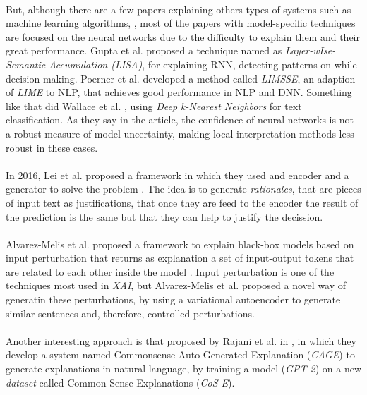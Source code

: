 \paragraph{}
But, although there are a few papers explaining others types of systems such as machine learning algorithms, \cite{Pappas2014}, most of the papers with model-specific techniques are focused on the neural networks due to the difficulty to explain them and their great performance. Gupta et al. proposed a technique named as \emph{Layer-wIse-Semantic-Accumulation (LISA)}, \cite{Gupta2018} for explaining RNN, detecting patterns on while decision making. Poerner et al. developed a method called \emph{LIMSSE}, an adaption of \emph{LIME} to NLP, that achieves good performance in NLP and DNN. Something like that did Wallace et al. \cite{Wallace2018}, using \emph{Deep k-Nearest Neighbors}\cite{Papernot2018} for text classification. As they say in the article, the confidence of neural networks is not a robust measure of model uncertainty, making local interpretation methods less robust in these cases.
\paragraph{}
In 2016, Lei et al. proposed a framework in which they used and encoder and a generator to solve the problem \cite{Lei2016}. The idea is to generate \emph{rationales}, that are pieces of input text as justifications, that once they are feed to the encoder the result of the prediction is the same but that they can help to justify the decission. 
\paragraph{}
Alvarez-Melis et al. proposed a framework to explain black-box models based on input perturbation that returns as explanation a set of input-output tokens that are related to each other inside the model \cite{Alvarez2017}. Input perturbation is one of the techniques most used in \emph{XAI}, but Alvarez-Melis et al. proposed a novel way of generatin these perturbations, by using a variational autoencoder to generate similar sentences and, therefore, controlled perturbations. 
\paragraph{}
Another interesting approach is that proposed by Rajani et al. in \cite{Rajani2019}, in which they develop a system named Commonsense Auto-Generated Explanation (\emph{CAGE}) to generate explanations in natural language, by training a model (\emph{GPT-2}) on a new \emph{dataset} called Common Sense Explanations (\emph{CoS-E}).

